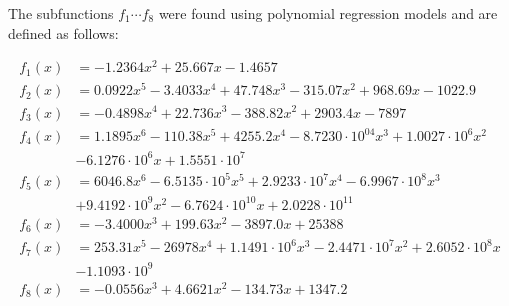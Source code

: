 \documentclass{article}
\begin{document}
    The subfunctions $f_1 \cdots f_8$ were found using polynomial regression models and are defined as follows:

    \begin{align*}
        f_1(x) &= -1.2364x^2 + 25.667x - 1.4657 \\
        f_2(x) &= 0.0922x^5 - 3.4033x^4 + 47.748x^3 - 315.07x^2 + 968.69x - 1022.9 \\
        f_3(x) &= -0.4898x^4 + 22.736x^3 - 388.82x^2 + 2903.4x - 7897 \\
        f_4(x) &= 1.1895x^6 - 110.38x^5 + 4255.2x^4 - 8.7230\cdot 10^04x^3 + 1.0027\cdot 10^6x^2 \\ &- 6.1276\cdot 10^6x + 1.5551\cdot 10^7 \\
        f_5(x) &= 6046.8x^6 - 6.5135 \cdot 10^5x^5 + 2.9233 \cdot 10^7x^4 - 6.9967 \cdot 10^8x^3 \\ &+ 9.4192 \cdot 10^9x^2 - 6.7624 \cdot 10^{10}x + 2.0228 \cdot 10^{11} \\
        f_6(x) &= -3.4000x^3 + 199.63x^2 - 3897.0x + 25388 \\
        f_7(x) &= 253.31x^5 - 26978x^4 + 1.1491 \cdot 10^6x^3 - 2.4471 \cdot 10^7x^2 + 2.6052 \cdot 10^8x \\ &- 1.1093 \cdot 10^9 \\
        f_8(x) &= -0.0556x^3 + 4.6621x^2 - 134.73x + 1347.2
    \end{align*}
\end{document}
